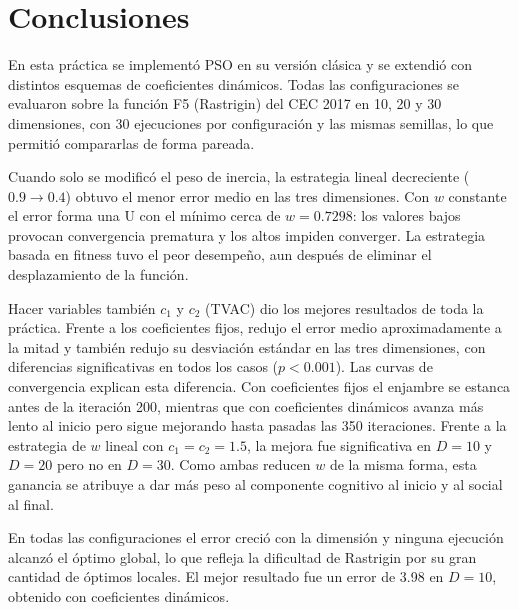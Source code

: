 \section{Conclusiones}
 
En esta práctica se implementó PSO en su versión clásica y se extendió con distintos esquemas de coeficientes dinámicos. Todas las configuraciones se evaluaron sobre la función F5 (Rastrigin) del CEC 2017 en 10, 20 y 30 dimensiones, con 30 ejecuciones por configuración y las mismas semillas, lo que permitió compararlas de forma pareada.
 
Cuando solo se modificó el peso de inercia, la estrategia lineal decreciente ($0.9 \rightarrow 0.4$) obtuvo el menor error medio en las tres dimensiones. Con $w$ constante el error forma una U con el mínimo cerca de $w = 0.7298$: los valores bajos provocan convergencia prematura y los altos impiden converger. La estrategia basada en fitness tuvo el peor desempeño, aun después de eliminar el desplazamiento de la función.
 
Hacer variables también $c_1$ y $c_2$ (TVAC) dio los mejores resultados de toda la práctica. Frente a los coeficientes fijos, redujo el error medio aproximadamente a la mitad y también redujo su desviación estándar en las tres dimensiones, con diferencias significativas en todos los casos ($p < 0.001$). Las curvas de convergencia explican esta diferencia. Con coeficientes fijos el enjambre se estanca antes de la iteración 200, mientras que con coeficientes dinámicos avanza más lento al inicio pero sigue mejorando hasta pasadas las 350 iteraciones. Frente a la estrategia de $w$ lineal con $c_1 = c_2 = 1.5$, la mejora fue significativa en $D = 10$ y $D = 20$ pero no en $D = 30$. Como ambas reducen $w$ de la misma forma, esta ganancia se atribuye a dar más peso al componente cognitivo al inicio y al social al final.
 
En todas las configuraciones el error creció con la dimensión y ninguna ejecución alcanzó el óptimo global, lo que refleja la dificultad de Rastrigin por su gran cantidad de óptimos locales. El mejor resultado fue un error de 3.98 en $D = 10$, obtenido con coeficientes dinámicos.
